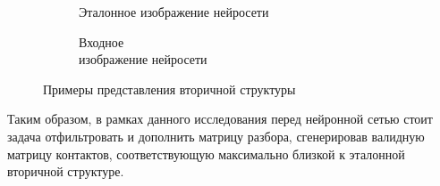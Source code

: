 \begin{figure}[h]
\begin{subfigure}{.3\textwidth}
  \caption{Эталонное изображение нейросети}
  \label{struc_b}
\end{subfigure}
\begin{subfigure}{.3\textwidth}
  \centering
  \caption{Входное \\ изображение нейросети}
  \label{struc_c}
\end{subfigure}
\caption{Примеры представления вторичной структуры}
\label{struc}
\end{figure}

\vspace{2cm}

Таким образом, в рамках данного исследования перед нейронной сетью стоит задача отфильтровать и дополнить матрицу разбора, сгенерировав валидную матрицу контактов, соответствующую максимально близкой к эталонной вторичной структуре.

